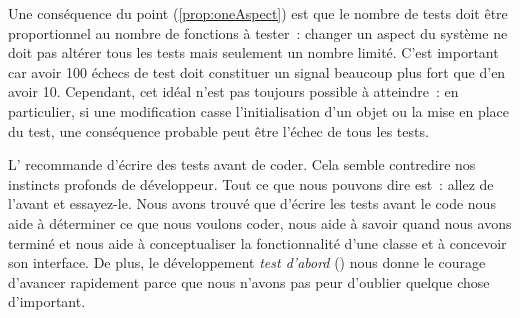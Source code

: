 \documentclass[a4paper,10pt,twoside]{book}
\begin{document}
Une conséquence du point (\ref{prop:oneAspect}) est que le nombre de tests doit être proportionnel au nombre de fonctions à tester~: changer un aspect du système ne doit pas altérer tous les tests mais seulement un nombre limité. C'est important car avoir 100 échecs de test doit constituer un signal beaucoup plus fort que d'en avoir 10. Cependant, cet idéal n'est pas toujours possible à atteindre~: en particulier, si une modification casse l'initialisation d'un objet ou la mise en place du test, une conséquence probable peut être l'échec de tous les tests.

L' recommande d'écrire des tests avant de coder. Cela semble contredire nos instincts profonds de développeur. Tout ce que nous pouvons dire est~: allez de l'avant et essayez-le. Nous avons trouvé que d'écrire les tests avant le code nous aide à déterminer ce que nous voulons coder, nous aide à savoir quand nous avons terminé et nous aide à conceptualiser la fonctionnalité d'une classe et à concevoir son interface.
De plus, le développement \flqq{}\emph{test d'abord}\frqq{} () nous donne le courage d'avancer rapidement parce que nous n'avons pas peur d'oublier quelque chose d'important. 

\end{document}

